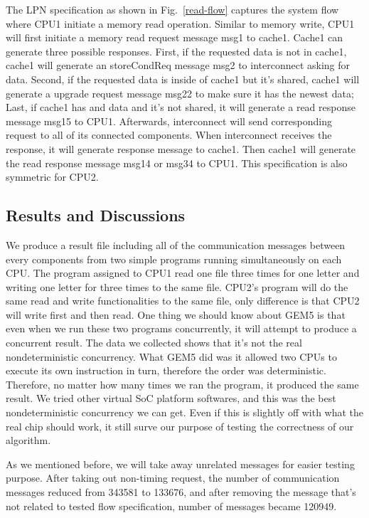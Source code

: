 \documentclass[conference]{IEEEtran}
\begin{document}
The LPN specification as shown in Fig.~\ref{read-flow} captures the system flow where CPU1 initiate a memory read operation. Similar to memory write, CPU1 will first initiate a memory read request message msg1 to cache1. Cache1 can generate three possible responses. First, if the requested data is not in cache1, cache1 will generate an storeCondReq message msg2 to interconnect asking for data. Second, if the requested data is inside of cache1 but it's shared, cache1 will generate a upgrade request message msg22 to make sure it has the newest data; Last,  if cache1 has and data and it's not shared, it will generate a read response message msg15 to CPU1. Afterwards, interconnect will send corresponding request to all of its connected components. When interconnect receives the response, it will generate response message to cache1. Then cache1 will generate the read response message msg14 or msg34 to CPU1. This specification is also symmetric for CPU2.

\subsection{Results and Discussions}
We produce a result file including all of the communication messages between every components from two simple programs running simultaneously on each CPU.  The program assigned to CPU1 read one file three times for one letter and writing one letter for three times to the same file. CPU2's program will do the same read and write functionalities to the same file, only difference is that CPU2 will write first and then read. One thing we should know about GEM5 is that even when we run these two programs concurrently, it will attempt to produce a concurrent result. The data we collected shows that it's not the real nondeterministic concurrency. What GEM5 did was it allowed two CPUs to execute its own instruction in turn, therefore the order was deterministic. Therefore, no matter how many times we ran the program, it produced the same result. We tried other virtual SoC platform softwares, and this was the best nondeterministic concurrency we can get. Even if this is slightly off with what the real chip should work, it still surve our purpose of testing the correctness of our algorithm.

As we mentioned before, we will take away unrelated messages for easier testing purpose. After taking out non-timing request, the number of communication messages reduced from 343581 to 133676, and after removing the message that's not related to tested flow specification, number of messages became 120949. 
\end{document}

